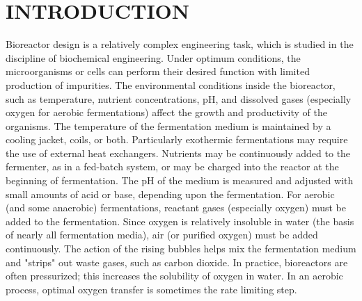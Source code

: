 %
%
%
%

\chapter{INTRODUCTION}
\thispagestyle{empty}

Bioreactor design is a relatively complex engineering task, which is studied in the discipline of biochemical engineering. Under optimum conditions, the microorganisms or cells can perform their desired function with limited production of impurities. The environmental conditions inside the bioreactor, such as temperature, nutrient concentrations, pH, and dissolved gases (especially oxygen for aerobic fermentations) affect the growth and productivity of the organisms. The temperature of the fermentation medium is maintained by a cooling jacket, coils, or both. Particularly exothermic fermentations may require the use of external heat exchangers. Nutrients may be continuously added to the fermenter, as in a fed-batch system, or may be charged into the reactor at the beginning of fermentation. The pH of the medium is measured and adjusted with small amounts of acid or base, depending upon the fermentation. For aerobic (and some anaerobic) fermentations, reactant gases (especially oxygen) must be added to the fermentation. Since oxygen is relatively insoluble in water (the basis of nearly all fermentation media), air (or purified oxygen) must be added continuously. The action of the rising bubbles helps mix the fermentation medium and "strips" out waste gases, such as carbon dioxide. In practice, bioreactors are often pressurized; this increases the solubility of oxygen in water. In an aerobic process, optimal oxygen transfer is sometimes the rate limiting step.

